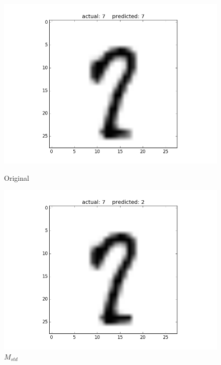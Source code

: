 \documentclass{article}
\begin{document}
\begin{figure}[h!]
	\begin{minipage}{0.3\textwidth}
		\centering
		\includegraphics[width=\textwidth]{O.png}
		\caption{Original}
	\end{minipage} \hfill
	\begin{minipage}{0.3\textwidth}
		\centering
		\includegraphics[width=\textwidth]{S.png}
		\caption{$M_{std}$}
	\end{minipage} 
	\begin{minipage}{0.3\textwidth}
		\centering

\end{minipage}
\end{figure}
\end{document}
